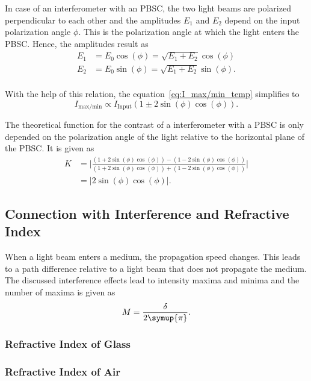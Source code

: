 In case of an interferometer with an PBSC, the two light beams are polarized perpendicular to each other and the amplitudes $E_1$ and $E_2$ depend on the input polarization angle $\phi$. This
is the polarization angle at which the light enters the PBSC.
Hence, the amplitudes result as
\begin{align*}
    E_1 &= E_0\cos(\phi) = \sqrt{E_1+E_2}\cos(\phi) \\
    E_2 &= E_0\sin(\phi) = \sqrt{E_1+E_2}\sin(\phi). \\
\end{align*}

With the help of this relation, the equation~\eqref{eq:I_max/min_temp} simplifies to
\begin{equation}
    I_{\text{max/min}} \propto I_{\text{Input}}(1 \pm 2\sin(\phi)\cos(\phi)).
    \label{eq:I_max/min}
\end{equation}

The theoretical function for the contrast of a interferometer with a PBSC is only depended on the polarization angle of the light relative to the horizontal plane of
the PBSC. It is given as
\begin{align}
    K &= \bigg|\frac{(1 + 2\sin(\phi)\cos(\phi)) - (1 - 2\sin(\phi)\cos(\phi))}{(1 + 2\sin(\phi)\cos(\phi)) + (1 - 2\sin(\phi)\cos(\phi))}\bigg| \\
      &= |2\sin(\phi)\cos(\phi)|.
      \label{eq:contrast_theo_func}
\end{align}

\subsection{Connection with Interference and Refractive Index}
\label{sec:Connection_Interference_n}
When a light beam enters a medium, the propagation speed changes. This leads to a path difference relative to a light beam that does not propagate the medium.
The discussed interference effects lead to intensity maxima and minima and the number of maxima is given as
\begin{equation}
    M = \frac{\delta}{2\symup{\pi}}. \notag %
\end{equation}

\subsubsection{Refractive Index of Glass}
\label{sec:n_Glass}


\subsubsection{Refractive Index of Air}
\label{sec:n_Air}